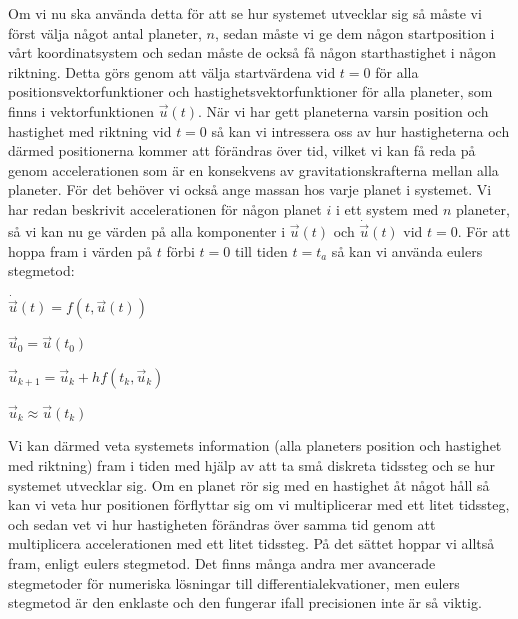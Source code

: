 \documentclass[10pt, a4paper]{amsart}
\begin{document}
Om vi nu ska använda detta för att se hur systemet utvecklar sig så måste vi först välja något antal planeter, $ n $, 
sedan måste vi ge dem någon startposition i vårt koordinatsystem och sedan måste de också få någon starthastighet i någon riktning.
Detta görs genom att välja startvärdena vid $ t = 0 $ för alla positionsvektorfunktioner och hastighetsvektorfunktioner för alla planeter, 
som finns i vektorfunktionen $ \vec u(t) $.
När vi har gett planeterna varsin position och hastighet med riktning vid $ t = 0 $ så kan vi intressera oss av hur hastigheterna och därmed positionerna kommer att förändras över tid,
vilket vi kan få reda på genom accelerationen som är en konsekvens av gravitationskrafterna mellan alla planeter.
För det behöver vi också ange massan hos varje planet i systemet.
Vi har redan beskrivit accelerationen för någon planet $ i $ i ett system med $ n $ planeter, 
så vi kan nu ge värden på alla komponenter i $ \vec u(t) $ och $ \dot \vec u(t) $ vid $ t = 0 $.
För att hoppa fram i värden på $ t $ förbi $ t = 0 $ till tiden $ t = t_a $ så kan vi använda eulers stegmetod:
\vspace{24pt plus 4pt minus 4pt}

\hspace{5ex}
$ \dot \vec u(t) = f(t, \vec u(t)) $
\bigskip

\hspace{5ex}
$ \vec u_0 = \vec u(t_0) $
\bigskip

\hspace{5ex}
$ \vec u_{k+1} = \vec u_k + hf(t_k, \vec u_k) $
\bigskip

\hspace{5ex}
$ \vec u_k \approx \vec u(t_k) $
\vspace{24pt plus 4pt minus 4pt}

Vi kan därmed veta systemets information (alla planeters position och hastighet med riktning) fram i tiden med hjälp av att ta små diskreta tidssteg och se hur systemet utvecklar sig. 
Om en planet rör sig med en hastighet åt något håll så kan vi veta hur positionen förflyttar sig om vi multiplicerar med ett litet tidssteg, 
och sedan vet vi hur hastigheten förändras över samma tid genom att multiplicera accelerationen med ett litet tidssteg. 
På det sättet hoppar vi alltså fram, enligt eulers stegmetod. 
Det finns många andra mer avancerade stegmetoder för numeriska lösningar till differentialekvationer,
men eulers stegmetod är den enklaste och den fungerar ifall precisionen inte är så viktig.

\newpage
\end{document}
